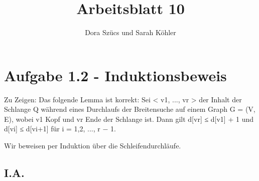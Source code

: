 \documentclass[11pt, oneside]{article}   	%
\title{Arbeitsblatt 10}
\author{Dora Szücs und Sarah Köhler}
\date{}							%
\begin{document}
\maketitle

\section*{Aufgabe 1.2 - Induktionsbeweis}
Zu Zeigen: Das folgende Lemma ist korrekt:
Sei < v1, ..., vr > der Inhalt der Schlange Q während eines Durchlaufs der Breitensuche auf einem Graph G = (V, E), wobei v1 Kopf und vr Ende der Schlange ist. Dann gilt d[vr] ≤ d[v1] + 1
und
d[vi] ≤ d[vi+1] für i = 1,2, ..., r − 1.

Wir beweisen per Induktion über die Schleifendurchläufe.

\subsection*{I.A.}
\end{document}
